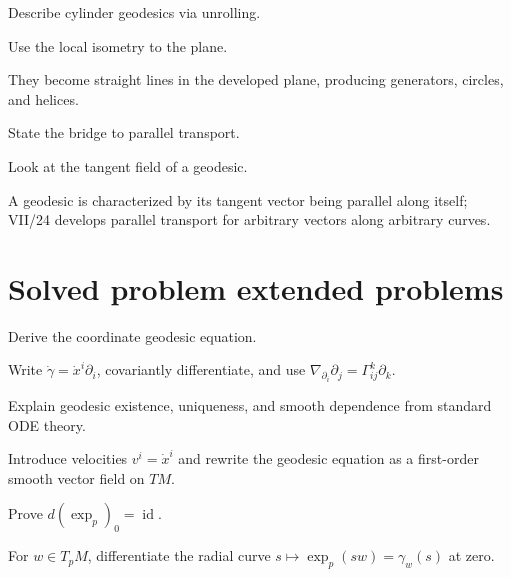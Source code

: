 \begin{exercise}\label{exr:vii23-23}
Describe cylinder geodesics via unrolling.
\end{exercise}
\begin{hint}
Use the local isometry to the plane.
\end{hint}
\begin{solution}
They become straight lines in the developed plane, producing generators, circles, and helices.
\end{solution}


\begin{exercise}\label{exr:vii23-24}
State the bridge to parallel transport.
\end{exercise}
\begin{hint}
Look at the tangent field of a geodesic.
\end{hint}
\begin{solution}
A geodesic is characterized by its tangent vector being parallel along itself; VII/24 develops parallel transport for arbitrary vectors along arbitrary curves.
\end{solution}

\section{Solved problem extended problems}

\begin{problem}\label{prob:vii23-01}
Derive the coordinate geodesic equation.
\end{problem}
\begin{solution}
Write \(\dot\gamma=\dot x^i\partial_i\), covariantly differentiate, and use \(\nabla_{\partial_i}\partial_j=\Gamma^k_{ij}\partial_k\).
\end{solution}


\begin{problem}\label{prob:vii23-02}
Explain geodesic existence, uniqueness, and smooth dependence from standard ODE theory.
\end{problem}
\begin{solution}
Introduce velocities \(v^i=\dot x^i\) and rewrite the geodesic equation as a first-order smooth vector field on \(TM\).
\end{solution}


\begin{problem}\label{prob:vii23-03}
Prove \(d(\exp_p)_0=\operatorname{id}\).
\end{problem}
\begin{solution}
For \(w\in T_pM\), differentiate the radial curve \(s\mapsto\exp_p(sw)=\gamma_w(s)\) at zero.
\end{solution}


